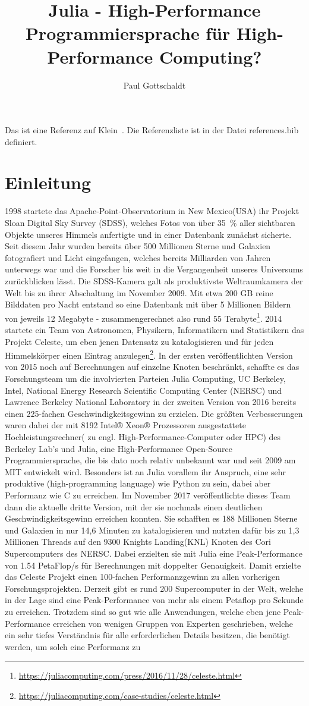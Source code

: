 \documentclass[proseminar,german,utf8]{zihpub}
\author{Paul Gottschaldt}
\title{Julia - High-Performance Programmiersprache für High-Performance Computing?}
\begin{document}
Das ist eine Referenz auf Klein~\cite{blackholes}. Die Referenzliste ist in der Datei references.bib definiert.

\section {Einleitung}
1998 startete das Apache-Point-Observatorium in New Mexico(USA) ihr Projekt Sloan Digital Sky Survey (SDSS), welches Fotos von über 35~\% aller sichtbaren Objekte unseres Himmels anfertigte und in einer Datenbank zunächst sicherte. Seit diesem Jahr wurden bereits über 500 Millionen Sterne und Galaxien fotografiert und Licht eingefangen, welches bereits Milliarden von Jahren unterwegs war und die Forscher bis weit in die Vergangenheit unseres Universums zurückblicken lässt. Die SDSS-Kamera galt als produktivste Weltraumkamera der Welt bis zu ihrer Abschaltung im November 2009. Mit etwa 200 GB reine Bilddaten pro Nacht entstand so eine Datenbank mit über 5 Millionen Bildern von jeweils 12 Megabyte - zusammengerechnet also rund 55 Terabyte\footnote{\url{https://juliacomputing.com/press/2016/11/28/celeste.html}}. 2014 startete ein Team von Astronomen, Physikern, Informatikern und Statistikern das Projekt Celeste, um eben jenen Datensatz zu katalogisieren und für jeden Himmelskörper einen Eintrag anzulegen\footnote{\url{https://juliacomputing.com/case-studies/celeste.html}}. In der ersten veröffentlichten Version von 2015 noch auf Berechnungen auf einzelne Knoten beschränkt, schaffte es das Forschungsteam um die involvierten Parteien Julia Computing, UC Berkeley, Intel, National Energy Research Scientific Computing Center (NERSC) und Lawrence Berkeley National Laboratory in der zweiten Version von 2016 bereits einen 225-fachen Geschwindigkeitsgewinn zu erzielen. Die größten Verbesserungen waren dabei der mit 8192 Intel® Xeon® Prozessoren ausgestattete Hochleistungsrechner( zu engl. High-Performance-Computer oder HPC) des Berkeley Lab's und Julia, eine High-Performance Open-Source Programmiersprache, die bis dato noch relativ unbekannt war und seit 2009 am MIT entwickelt wird. Besonders ist an Julia vorallem ihr Anspruch, eine sehr produktive (high-programming language) wie Python zu sein, dabei aber Performanz wie C zu erreichen. Im November 2017 veröffentlichte dieses Team dann die aktuelle dritte Version, mit der sie nochmals einen deutlichen Geschwindigkeitsgewinn erreichen konnten. Sie schafften es 188 Millionen Sterne und Galaxien in nur 14,6 Minuten zu katalogisieren und nutzten dafür bis zu 1,3 Millionen Threads auf den 9300 Knights Landing(KNL) Knoten des Cori Supercomputers des NERSC. Dabei erzielten sie mit Julia eine Peak-Performance von 1.54 PetaFlop/s für Berechnungen mit doppelter Genauigkeit. Damit erzielte das Celeste Projekt einen 100-fachen Performanzgewinn zu allen vorherigen Forschungsprojekten. Derzeit gibt es rund 200 Supercomputer in der Welt, welche in der Lage sind eine Peak-Performance von mehr als einem Petaflop pro Sekunde zu erreichen. Trotzdem sind so gut wie alle Anwendungen, welche eben jene Peak-Performance erreichen von wenigen Gruppen von Experten geschrieben, welche ein sehr tiefes Verständnis für alle erforderlichen Details besitzen, die benötigt werden, um solch eine Performanz zu 
\end{document}
